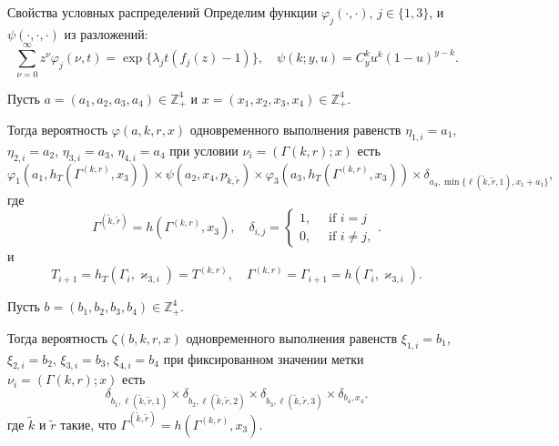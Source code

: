 \documentclass[10pt]{beamer}
\begin{document}
\begin{frame}[allowframebreaks]{Свойства условных распределений}
Определим функции $\varphi_j(\cdot,\cdot)$, $j\in \{1,3\}$, и $\psi(\cdot, \cdot, \cdot)$ из разложений:
\begin{equation*}
\sum_{\nu=0}^{\infty} z^\nu\varphi_j(\nu,t) = \exp\{\lambda_j t (f_j(z)-1)\}, \quad \psi(k;y,u)=C_y^k u^k (1-u)^{y-k}.	
\end{equation*}

Пусть $a=(a_1, a_2, a_3, a_4) \in \mathbb{Z}_+^4$ и $x=(x_1, x_2, x_3, x_4) \in \mathbb{Z}_+^4$.

Тогда вероятность $\varphi(a,k,r,x)$ одновременного выполнения равенств $\eta_{1,i}=a_1$, $\eta_{2,i}=a_2$, $\eta_{3,i}=a_3$, $\eta_{4,i}=a_4$ при условии  $\nu_i=(\Gamma{(k,r)}; x)$ есть 
\begin{equation}
\!\!\varphi_1(a_1,h_T(\Gamma^{({k},{r})},x_3)) \times \psi(a_2,x_4, p_{\tilde{k},\tilde{r}}) \times \varphi_3(a_3,h_T(\Gamma^{({k},{r})},x_3))
\times \delta_{a_4,\min{\{\ell(\tilde{k},\tilde{r},1), x_1+a_1}\}},
\end{equation}
где
\begin{equation*}
\Gamma^{(\tilde{k},\tilde{r})}=h(\Gamma^{(k,r)},x_3), \quad \delta_{i,j}=\begin{cases} 1, \quad \text{ if }i=j\\0, \quad \text{ if } i\neq j,
\end{cases}.
\end{equation*}
и 
$$
T_{i+1}=h_T(\Gamma_i,\varkappa_{3,i})= T^{(k,r)},\quad  \Gamma^{(k,r)}=\Gamma_{i+1}=h(\Gamma_i,\varkappa_{3,i}).
$$
\framebreak

Пусть $b=(b_1, b_2, b_3, b_4) \in \mathbb{Z}_+^4$. 

Тогда вероятность $\zeta(b, k, r, x)$ одновременного выполнения равенств $\xi_{1,i}=b_1$, $\xi_{2,i}=b_2$, $\xi_{3,i}=b_3$, $\xi_{4,i}=b_4$ при фиксированном значении метки $\nu_i=(\Gamma{(k,r)}; x)$ есть
\begin{equation}
\delta_{b_1,\ell(\tilde{k},\tilde{r},1)} \times \delta_{b_2,\ell(\tilde{k},\tilde{r},2)} \times 
\delta_{b_3,\ell(\tilde{k},\tilde{r},3)} \times \delta_{b_4,x_4}.
\end{equation}
где $\tilde{k}$ и $\tilde{r}$ такие, что $\Gamma^{(\tilde{k},\tilde{r})}=h(\Gamma^{(k,r)},x_3)$.
\end{frame}
\end{document}
